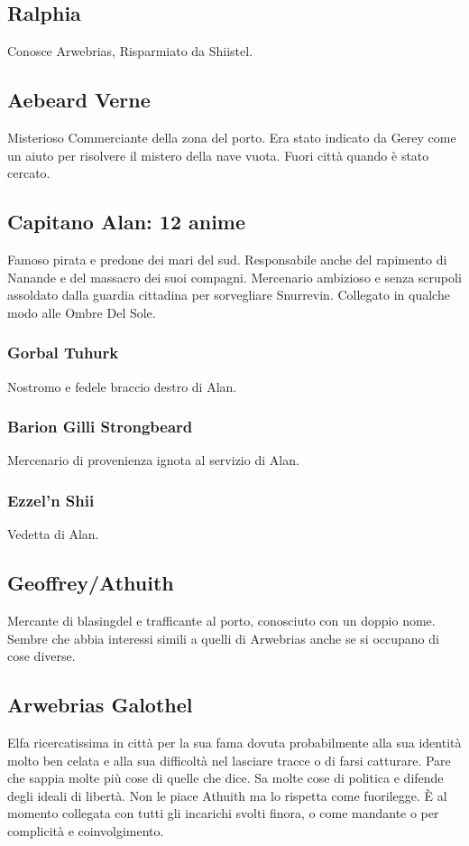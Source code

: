 \documentclass[10pt,twoside,twocolumn]{article}
\begin{document}
\subsection{Ralphia}\label{char:ralphia}
Conosce Arwebrias, Risparmiato da Shiistel.
\subsection{Aebeard Verne}\label{char:aebeard}
Misterioso Commerciante della zona del porto. Era stato indicato da Gerey come un
aiuto per risolvere il mistero della nave vuota. Fuori citt\`a quando \`e stato cercato.
\subsection{Capitano Alan: 12 anime}\label{char:alan}
Famoso pirata e predone dei mari del sud. Responsabile anche del rapimento di Nanande e
del massacro dei suoi compagni. Mercenario ambizioso e senza scrupoli assoldato
dalla guardia cittadina per sorvegliare Snurrevin. Collegato in qualche modo alle
Ombre Del Sole.
\subsubsection{Gorbal Tuhurk}\label{char:gorbal}
Nostromo e fedele braccio destro di Alan. 
\subsubsection{Barion Gilli Strongbeard}\label{char:barion}
Mercenario di provenienza ignota al servizio di Alan.
\subsubsection{Ezzel'n Shii}\label{char:ezzel}
Vedetta di Alan.
\subsection{Geoffrey/Athuith}\label{char:geoffrey}
Mercante di blasingdel e trafficante al porto, conosciuto con un doppio nome.
Sembre che abbia interessi simili a quelli di Arwebrias anche se si occupano di
cose diverse.
\subsection{Arwebrias Galothel}\label{char:arwebrias}
Elfa ricercatissima in citt\`a per la sua fama dovuta probabilmente alla sua identit\`a
molto ben celata e alla sua difficolt\`a nel lasciare tracce o di farsi catturare.
Pare che sappia molte pi\`u cose di quelle che dice. Sa molte cose di politica e difende
degli ideali di libert\`a. Non le piace Athuith ma lo rispetta come fuorilegge. \`E al
momento collegata con tutti gli incarichi svolti finora, o come mandante o per complicit\`a
e coinvolgimento.
\end{document}
